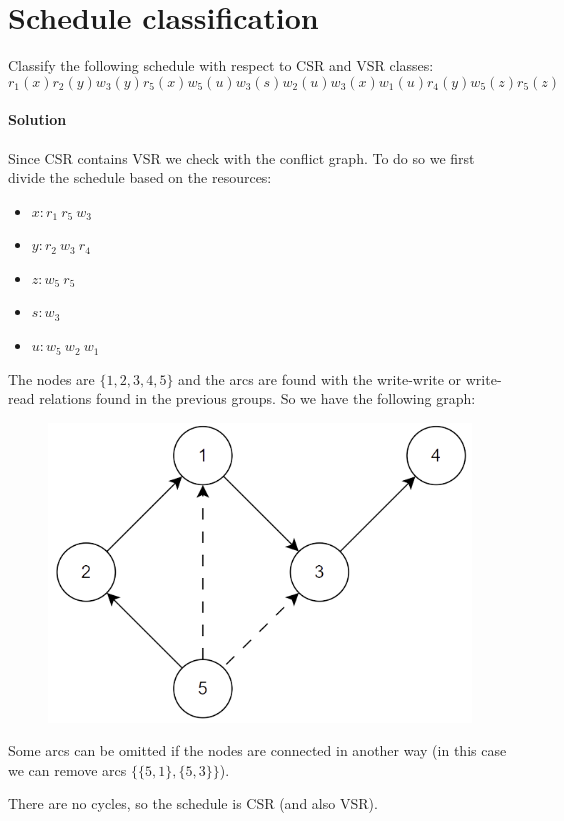 \section{Schedule classification}

Classify the following schedule with respect to CSR and VSR classes: 
\[r_1(x) r_2(y) w_3(y) r_5(x) w_5(u) w_3(s)w_2(u) w_3(x) w_1(u) r_4(y) w_5(z) r_5(z)\]

\paragraph*{Solution}
Since CSR contains VSR we check with the conflict graph. To do so we first divide the schedule based on the resources: 
\begin{itemize}
    \item $x: r_1 \: r_5 \:w_3$
    \item $y: r_2 \: w_3 \:r_4$
    \item $z: w_5 \: r_5$
    \item $s: w_3$
    \item $u: w_5 \: w_2 \:w_1$
\end{itemize}
The nodes are $\{1,2,3,4,5\}$ and the arcs are found with the write-write or write-read relations found in the previous groups. 
So we have the following graph:
\begin{figure}[H]
    \centering
    \includegraphics[width=0.5\linewidth]{images/conflictgraph.png}
\end{figure}
Some arcs can be omitted if the nodes are connected in another way (in this case we can remove arcs $\{\{5,1\},\{5,3\}\}$). 

There are no cycles, so the schedule is CSR (and also VSR). 